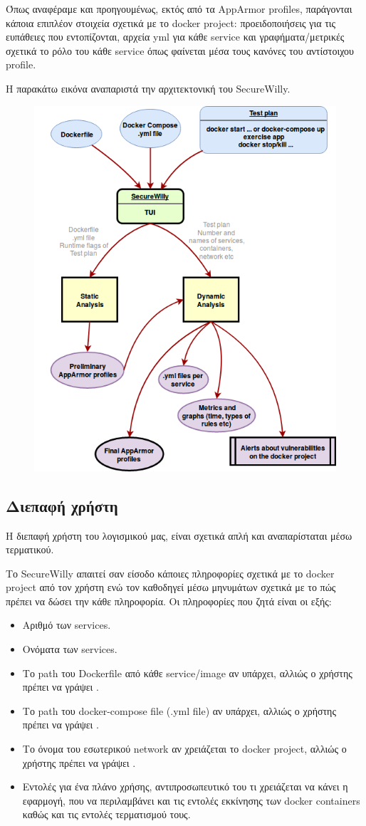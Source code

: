 Όπως αναφέραμε και προηγουμένως, εκτός από τα \en AppArmor profiles\gr{}, παράγονται κάποια επιπλέον στοιχεία σχετικά με το \en docker project\gr{}: προειδοποιήσεις για τις ευπάθειες που εντοπίζονται, αρχεία \en yml\gr{} για κάθε \en service\gr{} και γραφήματα/μετρικές σχετικά το ρόλο του κάθε \en service\gr{} όπως φαίνεται μέσα τους κανόνες του αντίστοιχου \en profile\gr{}.

Η παρακάτω εικόνα αναπαριστά την αρχιτεκτονική του \en SecureWilly. 
\begin{figure}[h!]
   \centering
   \includegraphics[width=0.6\linewidth]{figures/SecureWilly.png}
\end{figure}
\gr
\subsection*{Διεπαφή χρήστη}
Η διεπαφή χρήστη του λογισμικού μας, είναι σχετικά απλή και αναπαρίσταται μέσω τερματικού.

Το \en SecureWilly\gr{} απαιτεί σαν είσοδο κάποιες πληροφορίες σχετικά με το \en docker project\gr{} από τον χρήστη ενώ τον καθοδηγεί μέσω μηνυμάτων σχετικά με το πώς πρέπει να δώσει την κάθε πληροφορία. Οι πληροφορίες που ζητά είναι οι εξής:
\begin{itemize}
\item Αριθμό των \en services\gr{}.
\item Ονόματα των \en services\gr{}.
\item Το \en path\gr{} του \en Dockerfile\gr{} από κάθε \en service/image\gr{} αν υπάρχει, αλλιώς ο χρήστης πρέπει να γράψει .
\item Το \en path\gr{} του \en docker-compose file (.yml file)\gr{} αν υπάρχει, αλλιώς ο χρήστης πρέπει να γράψει .
\item Το όνομα του εσωτερικού \en network\gr{} αν χρειάζεται το \en docker project\gr{}, αλλιώς ο χρήστης πρέπει να γράψει .
\item Εντολές για ένα πλάνο χρήσης, αντιπροσωπευτικό του τι χρειάζεται να κάνει η εφαρμογή, που να περιλαμβάνει και τις εντολές εκκίνησης των \en docker containers\gr{} καθώς και τις εντολές τερματισμού τους.
\end{itemize}

